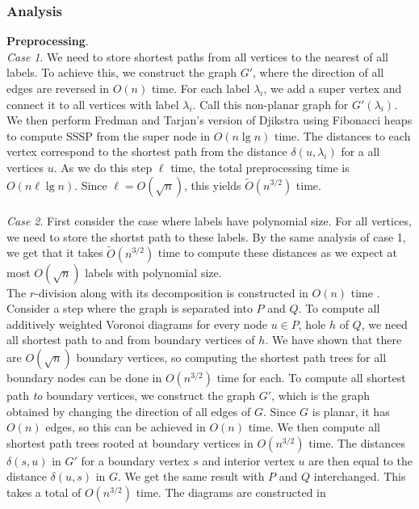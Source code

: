 \subsubsection{Analysis}\label{oracle2analysis}
\textbf{Preprocessing}. \\
\textit{Case 1}. We need to store shortest paths from all vertices to the nearest of all
labels. To achieve this, we construct the graph $G'$, where the
direction of all edges are reversed in $O(n)$ time. For each label $\lambda_i$, we add a
super vertex and connect it to all vertices with label $\lambda_i$. Call this non-planar
graph for $G'(\lambda_i)$. We then perform Fredman and Tarjan's version of Djikstra
\cite{fredman1987fibonacci} using Fibonacci heaps to compute SSSP from the super node in
$O(n\lg n)$ time. The distances to each vertex correspond to the shortest path
from the distance $\delta(u,\lambda_i)$ for a all vertices $u$. As we do this step $\ell$
time, the total preprocessing time is $O(n\ell \lg n)$. Since $\ell=O(\sqrt{n})$, this
yields $\tilde{O}(n^{3/2})$ time. \\
\\
\textit{Case 2}. First consider the case where labels have polynomial size. For all
vertices, we need to store the shortst path to these labels. By the same analysis of case 1,
we get that it takes $\tilde{O}(n^{3/2})$ time to compute these distances as we expect at
most $O(\sqrt{n})$ labels with polynomial size. \\
The $r$-division along with its decomposition is constructed in $O(n)$
time \cite{klein2013structured}. Consider a step where the graph is separated into $P$ and $Q$. To compute all additively weighted Voronoi diagrams for every node $u\in
P$, hole $h$ of $Q$, we need all
shortest path to and from boundary vertices of $h$. We have shown that there are
$O(\sqrt{n})$ boundary vertices, so computing the shortest path trees for all
boundary nodes can be done in $O(n^{3/2})$ time for each. To compute all shortest path \textit{to} boundary vertices, we construct the graph
$G'$, which is the graph obtained by changing the direction of all edges of $G$. Since
$G$ is planar, it has $O(n)$ edges, so this can be achieved in $O(n)$ time. We then
compute all shortest path trees rooted at boundary vertices in $O(n^{3/2})$ time. The
distances $\delta(s,u)$ in $G'$ for a boundary vertex $s$ and interior vertex $u$ are then equal
to the distance $\delta(u,s)$ in $G$. We get the same result with $P$ and $Q$
interchanged. This takes a total of $O(n^{3/2})$ time. The diagrams are constructed in
